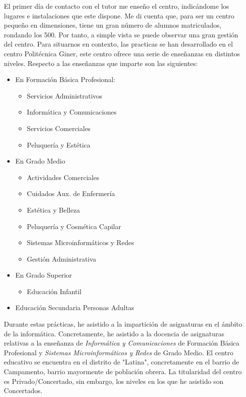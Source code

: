 \documentclass[spanish,12pt, a4paper,twoside]{paper}
\begin{document}
\justify
El primer día de contacto con el tutor me enseño el centro, indicándome los lugares e instalaciones que este dispone. Me di cuenta que, para ser un centro pequeño en dimensiones, tiene un gran número de alumnos matriculados, rondando los 500. Por tanto, a simple vista se puede observar una gran gestión del centro.
\justify
Para situarnos en contexto, las practicas se han desarrollado en el centro Politécnica Giner, este centro ofrece una serie de enseñanzas en distintos niveles.
Respecto a las enseñanzas que imparte son las siguientes:
\begin{itemize}
\item En Formación Básica Profesional:
\begin{itemize}
\item Servicios Administrativos
\item Informática y Comunicaciones
\item Servicios Comerciales
\item Peluquería y Estética
\end{itemize}
\item En Grado Medio
\begin{itemize}
\item Actividades Comerciales
\item Cuidados Aux. de Enfermería
\item Estética y Belleza
\item Peluquería y Cosmética Capilar
\item Sistemas Microinformáticos y Redes
\item Gestión Administrativa
\end{itemize}
\item En Grado Superior
\begin{itemize}
\item Educación Infantil
\end{itemize}
\item Educación Secundaria Personas Adultas
\end{itemize}
\justify
Durante estas prácticas, he asistido a la impartición de asignaturas en el ámbito de la informática. Concretamente, he asistido a la docencia de asignaturas relativas a la enseñanza de \textit{Informática y Comunicaciones} de Formación Básica Profesional y \textit{Sistemas Microinformáticos y Redes} de Grado Medio.
\justify
El centro educativo se encuentra en el distrito de "Latina", concretamente en el barrio de Campamento, barrio mayormente de población obrera. La titularidad del centro es Privado/Concertado, sin embargo, los niveles en los que he asistido son Concertados. 
\end{document}
